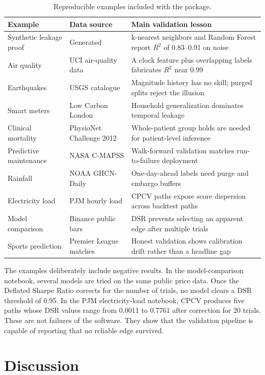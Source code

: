 \documentclass[10pt]{article}
\begin{document}
\begin{table}[htbp]
\centering
\caption{Reproducible examples included with the package.}
\label{tab:examples}
\small
\begin{tabular}{p{}p{}p{}}
\toprule
Example & Data source & Main validation lesson \\
\midrule
Synthetic leakage proof & Generated & k-nearest neighbors and Random Forest report $R^2$ of 0.83--0.91 on noise \\
Air quality & UCI air-quality data & A clock feature plus overlapping labels fabricates $R^2$ near 0.99 \\
Earthquakes & USGS catalogue & Magnitude history has no skill; purged splits reject the illusion \\
Smart meters & Low Carbon London & Household generalization dominates temporal leakage \\
Clinical mortality & PhysioNet Challenge 2012 & Whole-patient group holds are needed for patient-level inference \\
Predictive maintenance & NASA C-MAPSS & Walk-forward validation matches run-to-failure deployment \\
Rainfall & NOAA GHCN-Daily & One-day-ahead labels need purge and embargo buffers \\
Electricity load & PJM hourly load & CPCV paths expose score dispersion across backtest paths \\
Model comparison & Binance public bars & DSR prevents selecting an apparent edge after multiple trials \\
Sports prediction & Premier League matches & Honest validation shows calibration drift rather than a headline gap \\
\bottomrule
\end{tabular}
\end{table}

The examples deliberately include negative results. In the model-comparison
notebook, several models are tried on the same public price data. Once the
Deflated Sharpe Ratio corrects for the number of trials, no model clears a DSR
threshold of 0.95. In the PJM electricity-load notebook, CPCV produces five
paths whose DSR values range from 0.0011 to 0.7761 after correction for 20
trials. These are not failures of the software. They show that the validation
pipeline is capable of reporting that no reliable edge survived.

\section{Discussion}
\end{document}
